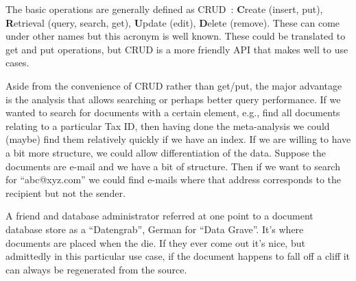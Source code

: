 The basic operations are generally defined as CRUD~\cite{martin1983managing}: \textbf{C}reate (insert, put), \textbf{R}etrieval (query, search, get), \textbf{U}pdate (edit), \textbf{D}elete (remove). These can come under other names but this acronym is well known. These could be translated to get and put operations, but CRUD is a more friendly API that makes well to use cases.

Aside from the convenience of CRUD rather than get/put, the major advantage is the analysis that allows searching or perhaps better query performance. If we wanted to search for documents with a certain element, e.g., find all documents relating to a particular Tax ID, then having done the meta-analysis we could (maybe) find them relatively quickly if we have an index. If we are willing to have a bit more structure, we could allow differentiation of the data. Suppose the documents are e-mail and we have a bit of structure. Then if we want to search for ``abc@xyz.com'' we could find e-mails where that address corresponds to the recipient but not the sender.

A friend and database administrator referred at one point to a document database store as a ``Datengrab'', German for ``Data Grave''. It's where documents are placed when the die. If they ever come out it's nice, but admittedly in this particular use case, if the document happens to fall off a cliff it can always be regenerated from the source.




